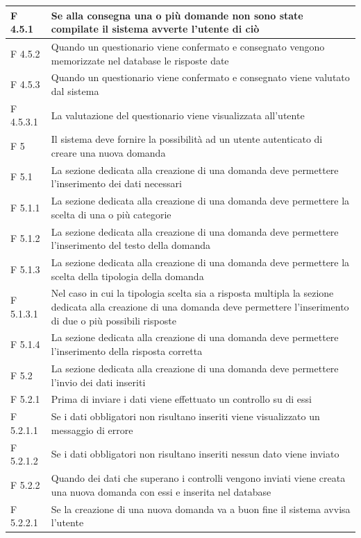 \documentclass[a4paper,11pt]{article}
\begin{document}
\begin{longtable}{p{}p{}}
\midrule
F 4.5.1 & Se alla consegna una o più domande non sono state compilate il sistema avverte l'utente di ciò\\
\midrule
F 4.5.2 & Quando un questionario viene confermato e consegnato vengono memorizzate nel database le risposte date\\
\midrule
F 4.5.3 & Quando un questionario viene confermato e consegnato viene valutato dal sistema\\
\midrule
F 4.5.3.1 & La valutazione del questionario viene visualizzata all'utente\\
\midrule
F 5 & Il sistema deve fornire la possibilità ad un utente autenticato di creare una nuova domanda\\
\midrule
F 5.1 & La sezione dedicata alla creazione di una domanda deve permettere l'inserimento dei dati necessari\\
\midrule
F 5.1.1 & La sezione dedicata alla creazione di una domanda deve permettere la scelta di una o più categorie\\
\midrule
F 5.1.2 & La sezione dedicata alla creazione di una domanda deve permettere l'inserimento del testo della domanda\\
\midrule
F 5.1.3 & La sezione dedicata alla creazione di una domanda deve permettere la scelta della tipologia della domanda\\
\midrule
F 5.1.3.1 & Nel caso in cui la tipologia scelta sia a risposta multipla la sezione dedicata alla creazione di una domanda deve permettere l'inserimento di due o più possibili risposte\\
\midrule
F 5.1.4 & La sezione dedicata alla creazione di una domanda deve permettere l'inserimento della risposta corretta\\
\midrule
F 5.2 & La sezione dedicata alla creazione di una domanda deve permettere l'invio dei dati inseriti\\
\midrule
F 5.2.1 & Prima di inviare i dati viene effettuato un controllo su di essi\\
\midrule
F 5.2.1.1 & Se i dati obbligatori non risultano inseriti viene visualizzato un messaggio di errore\\
\midrule
F 5.2.1.2 & Se i dati obbligatori non risultano inseriti nessun dato viene inviato\\
\midrule
F 5.2.2 & Quando dei dati che superano i controlli vengono inviati viene creata una nuova domanda con essi e inserita nel database\\
\midrule
F 5.2.2.1 & Se la creazione di una nuova domanda va a buon fine il sistema avvisa l'utente\\

\end{longtable}
\end{document}
